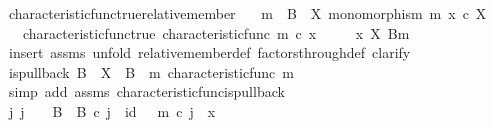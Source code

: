 \begin{isabellebody}
\isamarkupfalse%
%
\endisatagproof
{\isafoldproof}%
%
\isadelimproof
\isanewline
%
\endisadelimproof
\isanewline
{}\isamarkupfalse%
\ characteristic{\isacharunderscore}{\kern0pt}func{\isacharunderscore}{\kern0pt}true{\isacharunderscore}{\kern0pt}relative{\isacharunderscore}{\kern0pt}member{\isacharcolon}{\kern0pt}\isanewline
\ \ \ {\isachardoublequoteopen}m\ {\isacharcolon}{\kern0pt}\ B\ {\isasymrightarrow}\ X{\isachardoublequoteclose}\ {\isachardoublequoteopen}monomorphism\ m{\isachardoublequoteclose}\ {\isachardoublequoteopen}x\ {\isasymin}\isactrlsub c\ X{\isachardoublequoteclose}\isanewline
\ \ \ characteristic{\isacharunderscore}{\kern0pt}func{\isacharunderscore}{\kern0pt}true{\isacharcolon}{\kern0pt}\ {\isachardoublequoteopen}characteristic{\isacharunderscore}{\kern0pt}func\ m\ {\isasymcirc}\isactrlsub c\ x\ {\isacharequal}{\kern0pt}\ {\isasymt}{\isachardoublequoteclose}\isanewline
\ \ \ {\isachardoublequoteopen}x\ {\isasymin}\isactrlbsub X\isactrlesub \ {\isacharparenleft}{\kern0pt}B{\isacharcomma}{\kern0pt}m{\isacharparenright}{\kern0pt}{\isachardoublequoteclose}\isanewline
%
\isadelimproof
%
\endisadelimproof
%
\isatagproof
{}\isamarkupfalse%
\ {\isacharparenleft}{\kern0pt}insert\ assms{\isacharcomma}{\kern0pt}\ unfold\ relative{\isacharunderscore}{\kern0pt}member{\isacharunderscore}{\kern0pt}def{}\ factors{\isacharunderscore}{\kern0pt}through{\isacharunderscore}{\kern0pt}def{\isacharcomma}{\kern0pt}\ clarify{\isacharparenright}{\kern0pt}\isanewline
\ \ \isamarkupfalse%
\ {\isachardoublequoteopen}is{\isacharunderscore}{\kern0pt}pullback\ B\ {\isasymone}\ X\ {\isasymOmega}\ {\isacharparenleft}{\kern0pt}{\isasymbeta}\isactrlbsub B\isactrlesub {\isacharparenright}{\kern0pt}\ {\isasymt}\ m\ {\isacharparenleft}{\kern0pt}characteristic{\isacharunderscore}{\kern0pt}func\ m{\isacharparenright}{\kern0pt}{\isachardoublequoteclose}\isanewline
\ \ \ \ \isamarkupfalse%
\ {\isacharparenleft}{\kern0pt}simp\ add{\isacharcolon}{\kern0pt}\ assms\ characteristic{\isacharunderscore}{\kern0pt}func{\isacharunderscore}{\kern0pt}is{\isacharunderscore}{\kern0pt}pullback{\isacharparenright}{\kern0pt}\isanewline
\ \ \isamarkupfalse%
\ \isamarkupfalse%
\ {\isachardoublequoteopen}{\isasymexists}j{\isachardot}{\kern0pt}\ j\ {\isacharcolon}{\kern0pt}\ {\isasymone}\ {\isasymrightarrow}\ B\ {\isasymand}\ {\isasymbeta}\isactrlbsub B\isactrlesub \ {\isasymcirc}\isactrlsub c\ j\ {\isacharequal}{\kern0pt}\ id\ {\isasymone}\ {\isasymand}\ m\ {\isasymcirc}\isactrlsub c\ j\ {\isacharequal}{\kern0pt}\ x{\isachardoublequoteclose}\isanewline

\end{isabellebody}
